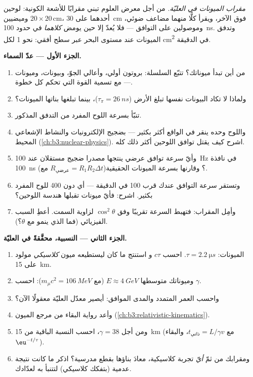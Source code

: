 \begin{problem}\label{pb:b3:particle-physics:1}
\emph{مقراب الميونات في العليّة.} من أجل معرض العلوم تبني
مقرابًا للأشعة الكونية: لوحين وميضيين $20\times20$\,\unit{cm}،
أحدهما على \qty{30}{cm} فوق الآخر، ويقرأ كلًّا منهما مضاعف ضوئي،
وموصولين على التوافق --- فلا يُعدّ إلا حين يومض \emph{كلاهما}
في حدود \qty{100}{ns}. وتدفق الميونات عند مستوى البحر عبر سطح
أفقي: نحو 1 لكل \unit{cm^2} في الدقيقة.

\medskip\noindent\textbf{الجزء الأول --- عدّ السماء.}

\begin{enumerate}
  \item من أين تبدأ ميوناتك؟ تتبّع السلسلة: بروتون
        أولي، وأعالي الجوّ، وبيونات، وميونات --- مع تسمية
        القوة التي تحكم كل خطوة.
  \item ولماذا لا تكاد البيونات نفسها تبلغ
        الأرض ($\tau_\pi = \qty{26}{ns}$)، بينما تبلغها بناتها
        الميونات؟
  \item تنبّأ بسرعة اللوح المفرد من التدفق المذكور.
  \item واللوح وحده ينقر في الواقع أكثر بكثير ---
        بضجيج الإلكترونيات والنشاط الإشعاعي المحيط
        (\cref{ch:b3:nuclear-physics}). اشرح كيف يقتل
        توافق اللوحين أكثر ذلك كله.
  \item وأيّ سرعة توافق عرضي ينتجها مصدرا ضجيج مستقلان
        عند \qty{100}{Hz} في نافذة \qty{100}{ns}
        (مع $R_{\text{عرضي}} = R_1R_2\Delta t$)؟ وقارنها
        بسرعة الميونات الحقيقية.
  \item وتستقر سرعة التوافق عندك قرب 100 في الدقيقة ---
        أي دون 400 للوح المفرد بكثير. اشرح: فأيّ ميونات
        تقبلها هندسة اللوحين؟
  \item وأمِل المقراب: فتهبط السرعة تقريبًا وفق
        $\cos^2\theta$ لزاوية السمت. أعطِ السبب
        الفيزيائي (فما الذي ينمو مع $\theta$؟).
\end{enumerate}

\medskip\noindent\textbf{الجزء الثاني --- النسبية، محقَّقةً في العليّة.}

\begin{enumerate}[resume]
  \item الميونات: $\tau = \qty{2.2}{\micro s}$. احسب $c\tau$ و
        استنتج ما كان ليستطيعه ميون \emph{كلاسيكي} مولود على
        \qty{15}{km}.
  \item وميوناتك متوسطها $E \approx \qty{4}{GeV}$
        (مع $m_\mu c^2 = \qty{106}{MeV}$): احسب $\gamma$.
  \item واحسب العمر المتمدد والمدى الموافق: أيصير معدّل
        العليّة معقولًا الآن؟
  \item وأعد رواية البقاء من مرجع الميون
        (\cref{ch:b3:relativistic-kinematics}).
  \item ومن أجل $\gamma = 38$، احسب النسبة الباقية من
        \qty{15}{km} (مع $t_{\text{ذاتي}} = L/\gamma v$، والبقاء
        $\eu^{-t/\tau}$).
  \item ومقرابك من ثمّ \emph{أيّ} تجربة كلاسيكية،
        معادَ بناؤها بقطع مدرسية؟ اذكر ما كانت نتيجة
        عدمية (بتفكك كلاسيكي) لتتنبأ به لعدّادك.
\end{enumerate}


\end{problem}
